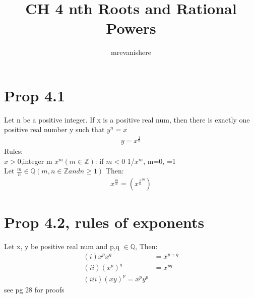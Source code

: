 \documentclass[12pt]{article}
\newcommand{\Q}{\mathbb{Q}}
\newcommand{\Z}{\mathbb{Z}}
\begin{document}
\title{CH 4 nth Roots and Rational Powers}
\author{mrevanishere}
\maketitle

\section{Prop 4.1}
	Let n be a positive integer. If x is a positive real num, then there is
	exactly one positive real number y such that $ y^n = x $
	\begin{align*}
		y = x^{\frac{1}{n}}
	\end{align*}
	Rules: \\
	$ x > 0 $,integer m $ x^m (m\in \Z) $: if $ m < 0 $ 1/$ x^m $, m=0, =1 \\
	Let $ \frac{m}{n} \in \Q (m, n \in \Z and n \ge 1)$ Then:
	\begin{align*}
		x^{\frac{m}{n}} = (x^{\frac{1}{n}}^m)
	\end{align*}
\section{Prop 4.2, rules of exponents}
	Let x, y be positive real num and p,q $ \in\Q $, Then:
	\begin{align*}
		(i) x^p x^q &= x^{p+q} \\
		(ii) (x^p)^q &=  x^{pq} \\
		(iii) (xy)^p = x^p y^p 
	\end{align*}
	see pg 28 for proofs
	
\end{document}
